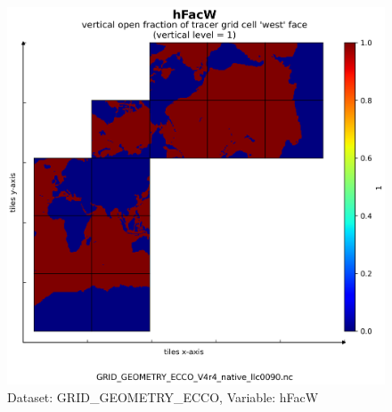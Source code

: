 \begin{figure}[H]
\centering
\includegraphics[scale=0.55]{../images/plots/v4r4/native_plots_coords/Geometry_Parameters_for_the_Lat-Lon-Cap_90_(llc90)_Native_Model_Grid_(Version_4_Release_4)/hFacW.png}
\caption{Dataset: GRID\_GEOMETRY\_ECCO, Variable: hFacW}
\label{tab:table-GRID_GEOMETRY_ECCO_hFacW-Plot}
\end{figure}
\newpage
\pagebreak
